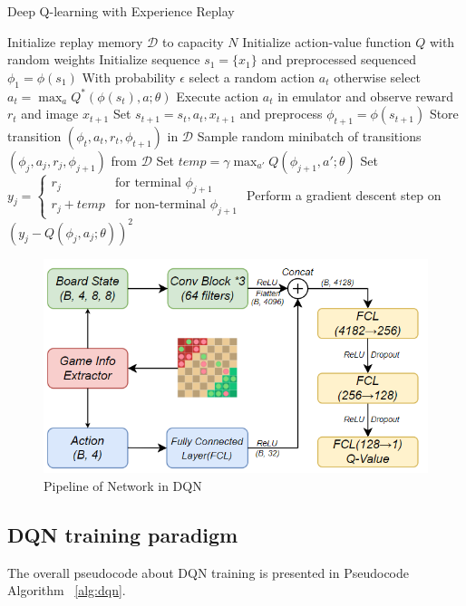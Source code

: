 \begin{algorithm}[H]
\caption{Deep Q-learning with Experience Replay}
\label{alg:dqn}
\begin{algorithmic}[1]
\State Initialize replay memory $\mathcal{D}$ to capacity $N$
\State Initialize action-value function $Q$ with random weights
    \State Initialize sequence $s_1 = \{x_1\}$ and preprocessed sequenced $\phi_1 = \phi(s_1)$
        \State With probability $\epsilon$ select a random action $a_t$
        \State otherwise select $a_t = \max_{a} Q^*(\phi(s_t), a; \theta)$
        \State Execute action $a_t$ in emulator and observe reward $r_t$ and image $x_{t+1}$
        \State Set $s_{t+1} = s_t, a_t, x_{t+1}$ and preprocess $\phi_{t+1} = \phi(s_{t+1})$
        \State Store transition $(\phi_t, a_t, r_t, \phi_{t+1})$ in $\mathcal{D}$
        \State Sample random minibatch of transitions $(\phi_j, a_j, r_j, \phi_{j+1})$ from $\mathcal{D}$
        \State Set $temp = \gamma \max_{a'} Q(\phi_{j+1}, a'; \theta)$
        \State Set $y_j = \left\{
            \begin{array}{ll}
                r_j & \text{for terminal } \phi_{j+1} \\
                r_j + temp & \text{for non-terminal } \phi_{j+1}
            \end{array}
        \right.$
        \State Perform a gradient descent step on $(y_j - Q(\phi_j, a_j; \theta))^2$
    \EndFor
\EndFor
\end{algorithmic}
\end{algorithm}
\begin{figure}[h]
    \centering
    \includegraphics[width=1\columnwidth]{figures/pipeline.png}
    \caption{Pipeline of Network in DQN}
    \label{fig:pipeline}
\end{figure}
\subsection{DQN training paradigm}
The overall pseudocode about DQN\cite{DBLP:journals/corr/MnihKSGAWR13} training is presented in Pseudocode Algorithm ~\ref{alg:dqn}.

